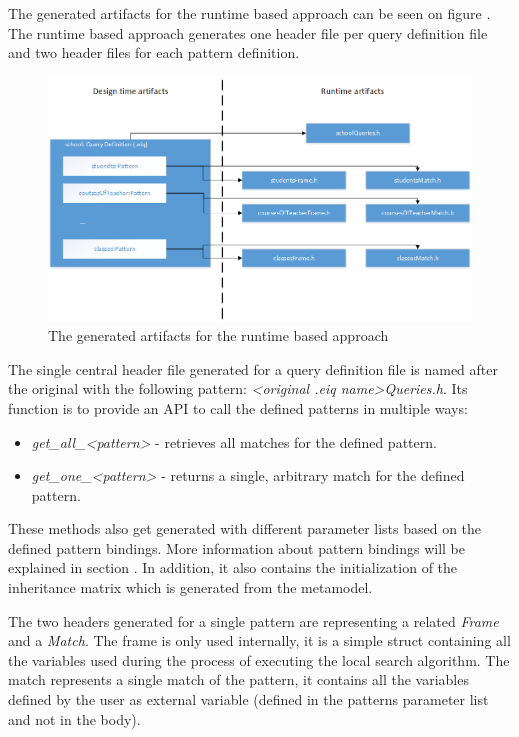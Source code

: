 The generated artifacts for the runtime based approach can be seen on figure
. The runtime based approach generates one header file per
query definition file and two header files for each pattern definition. 

\begin{figure}[!ht]
\centering
\includegraphics[width=130mm, keepaspectratio]{figures/runtime_gen_art.png}
\caption{The generated artifacts for the runtime based approach}
\label{fig:runtime_gen}
\end{figure}

The single central header file generated for a query definition file is named
after the original with the following pattern: \emph{<original .eiq name>Queries.h}.
Its function is to provide an API to call the defined patterns in multiple
ways:

\begin{itemize}
  \item \emph{get\_all\_<pattern>} - retrieves all matches for the defined pattern.
  \item \emph{get\_one\_<pattern>} - returns a single, arbitrary match for
  the defined pattern.
\end{itemize}

These methods also get generated with different parameter lists based on the
defined pattern bindings. More information about pattern bindings will be
explained in section . In addition, it also contains
the initialization of the inheritance matrix which is generated from the
metamodel.

The two headers generated for a single pattern are representing a related
\emph{Frame} and a \emph{Match}. The frame is only used internally, it is a
simple struct containing all the variables used during the process of
executing the local search algorithm. The match represents a single match of the
pattern, it contains all the variables defined by the user as external variable
(defined in the patterns parameter list and not in the body).

